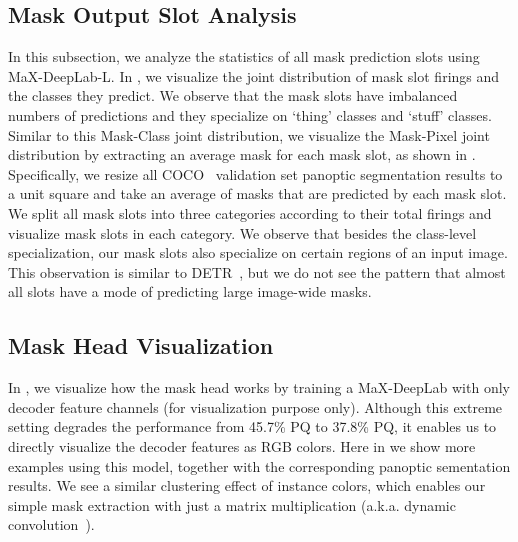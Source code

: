 \subsection{Mask Output Slot Analysis}
In this subsection, we analyze the statistics of all  mask prediction slots using MaX-DeepLab-L. In , we visualize the joint distribution of mask slot firings and the classes they predict. We observe that the mask slots have imbalanced numbers of predictions and they specialize on `thing' classes and `stuff' classes. Similar to this Mask-Class joint distribution, we visualize the Mask-Pixel joint distribution by extracting an average mask for each mask slot, as shown in . Specifically, we resize all COCO~\cite{lin2014microsoft} validation set panoptic segmentation results to a unit square and take an average of masks that are predicted by each mask slot. We split all mask slots into three categories according to their total firings and visualize mask slots in each category. We observe that besides the class-level specialization, our mask slots also specialize on certain regions of an input image. This observation is similar to DETR~\cite{carion2020end}, but we do not see the pattern that almost all slots have a mode of predicting large image-wide masks.

\subsection{Mask Head Visualization}
In , we visualize how the mask head works by training a MaX-DeepLab with only  decoder feature channels (for visualization purpose only). Although this extreme setting degrades the performance from 45.7\% PQ to 37.8\% PQ, it enables us to directly visualize the decoder features as RGB colors. Here in  we show more examples using this model, together with the corresponding panoptic sementation results. We see a similar clustering effect of instance colors, which enables our simple mask extraction with just a matrix multiplication (a.k.a. dynamic convolution~\cite{tian2020conditional,wang2020solov2,jia2016dynamic,yang2019condconv}).

